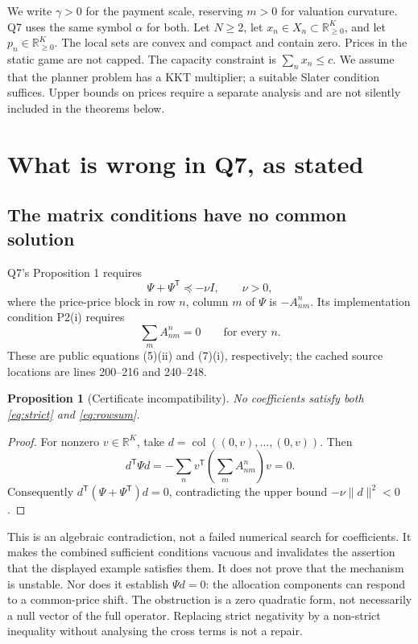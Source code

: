 \documentclass[11pt,a4paper]{article}
\newtheorem{proposition}{Proposition}
\newcommand{\R}{\mathbb R}
\newcommand{\col}{\operatorname{col}}
\begin{document}
We write $\gamma>0$ for the payment scale, reserving $m>0$ for valuation
curvature. Q7 uses the same symbol $\alpha$ for both. Let $N\geq2$, let
$x_n\in X_n\subset\R^K_{\geq0}$, and let $p_n\in\R^K_{\geq0}$. The
local sets are convex and compact and contain zero. Prices in the static
game are not capped. The capacity constraint is $\sum_nx_n\leq c$.
We assume that the planner problem has a KKT multiplier; a suitable Slater
condition suffices. Upper bounds on prices require a separate analysis and
are not silently included in the theorems below.

\section{What is wrong in Q7, as stated}

\subsection{The matrix conditions have no common solution}

Q7's Proposition 1 requires
\begin{equation}
 \Psi+\Psi^{\mathsf T}\preceq-\nu I,\qquad \nu>0,
 \label{eq:strict}
\end{equation}
where the price-price block in row $n$, column $m$ of $\Psi$ is
$-A^n_{nm}$. Its implementation condition P2(i) requires
\begin{equation}
 \sum_m A^n_{nm}=0\qquad\text{for every }n.
 \label{eq:rowsum}
\end{equation}
These are public equations (5)(ii) and (7)(i), respectively; the cached
source locations are lines 200--216 and 240--248.

\begin{proposition}[Certificate incompatibility]
No coefficients satisfy both \eqref{eq:strict} and \eqref{eq:rowsum}.
\end{proposition}
\begin{proof}
For nonzero $v\in\R^K$, take $d=\col((0,v),\ldots,(0,v))$. Then
\begin{equation}
 d^{\mathsf T}\Psi d
 =-\sum_n v^{\mathsf T}\left(\sum_m A^n_{nm}\right)v=0.
\end{equation}
Consequently $d^{\mathsf T}(\Psi+\Psi^{\mathsf T})d=0$, contradicting
the upper bound $-\nu\|d\|^2<0$.
\end{proof}

This is an algebraic contradiction, not a failed numerical search for
coefficients. It makes the combined sufficient conditions vacuous and
invalidates the assertion that the displayed example satisfies them.
It does not prove that the mechanism is unstable. Nor does it establish
$\Psi d=0$: the allocation components can respond to a common-price shift.
The obstruction is a zero quadratic form, not necessarily a null vector
of the full operator. Replacing strict negativity by a non-strict inequality
without analysing the cross terms is not a repair.
\end{document}
